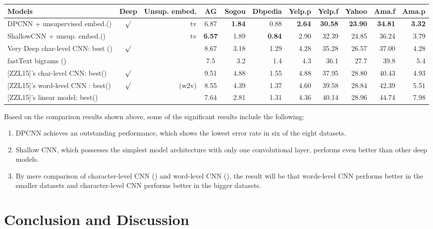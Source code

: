 \documentclass[]{krantz}
\begin{document}
\begin{longtable}[]{@{}lcrcrrrrrrr@{}}
\toprule
Models & Deep & Unsup. embed. & AG & Sogou & Dbpedia & Yelp.p & Yelp.f & Yahoo & Ama.f & Ama.p\tabularnewline
\midrule
\endhead
DPCNN + unsupervised embed.(\citet{Johnson2017DeepPC}) & \(\surd\) & tv & 6.87 & \textbf{1.84} & 0.88 & \textbf{2.64} & \textbf{30.58} & \textbf{23.90} & \textbf{34.81} & \textbf{3.32}\tabularnewline
ShallowCNN + unsup. embed.(\citet{Kim2014ConvolutionalNN}) & & tv & \textbf{6.57} & 1.89 & \textbf{0.84} & 2.90 & 32.39 & 24.85 & 36.24 & 3.79\tabularnewline
Very Deep char-level CNN: best (\citet{Schwenk2017VeryDC}) & \(\surd\) & & 8.67 & 3.18 & 1.29 & 4.28 & 35.28 & 26.57 & 37.00 & 4.28\tabularnewline
fastText bigrams (\citet{Joulin2017BagOT}) & & & 7.5 & 3.2 & 1.4 & 4.3 & 36.1 & 27.7 & 39.8 & 5.4\tabularnewline
{[}ZZL15{]}'s char-level CNN: best(\citet{Zhang2015CharacterlevelCN}) & \(\surd\) & & 9.51 & 4.88 & 1.55 & 4.88 & 37.95 & 28.80 & 40.43 & 4.93\tabularnewline
{[}ZZL15{]}'s word-level CNN : best(\citet{Zhang2015CharacterlevelCN}) & \(\surd\) & (w2v) & 8.55 & 4.39 & 1.37 & 4.60 & 39.58 & 28.84 & 42.39 & 5.51\tabularnewline
{[}ZZL15{]}'s linear model: best(\citet{Zhang2015CharacterlevelCN}) & & & 7.64 & 2.81 & 1.31 & 4.36 & 40.14 & 28.96 & 44.74 & 7.98\tabularnewline
\bottomrule
\end{longtable}

Based on the comparison results shown above, some of the significant results include the following:

\begin{enumerate}
\def\labelenumi{\arabic{enumi}.}
\item
  DPCNN achieves an outstanding performance, which shows the lowest error rate in six of the eight datasets.
\item
  Shallow CNN, which possesses the simplest model architecture with only one convolutional layer, performs even better than other deep models.
\item
  By mere comparison of character-level CNN (\citet{Zhang2015CharacterlevelCN}) and word-level CNN (\citet{Zhang2015CharacterlevelCN}), the result will be that words-level CNN performs better in the smaller datasets and character-level CNN performs better in the bigger datasets.
\end{enumerate}

\hypertarget{conclusion-and-discussion}{%
\section{Conclusion and Discussion}\label{conclusion-and-discussion}}
\end{document}
